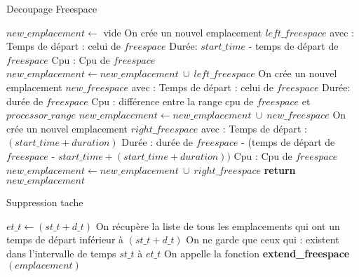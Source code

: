 \documentclass{report}
\begin{document}
\begin{algorithm}
\caption{Decoupage Freespace}\label{cut_freespace}
\begin{algorithmic}[1]
	\State $new\_emplacement \gets$ vide
	\State
		\State On crée un nouvel emplacement $left\_freespace$ avec :
			\State \hspace{\algorithmicindent} Temps de départ : celui de $freespace$
			\State \hspace{\algorithmicindent} Durée: $start\_time$ - temps de départ de $freespace$
			\State \hspace{\algorithmicindent} Cpu : Cpu de $freespace$
		\State $new\_emplacement \gets new\_emplacement\ \cup\ left\_freespace$ 
	\EndIf
	\State
		\State On crée un nouvel emplacement $new\_freespace$ avec :
			\State \hspace{\algorithmicindent} Temps de départ : celui de $freespace$
			\State \hspace{\algorithmicindent} Durée: durée de $freespace$
			\State \hspace{\algorithmicindent} Cpu : différence entre la range cpu de $freespace$ et $processor\_range$
		\State $new\_emplacement \gets new\_emplacement\ \cup\ new\_freespace$ 
	\EndIf
	\State
	\State On crée un nouvel emplacement $right\_freespace$ avec :
		\State \hspace{\algorithmicindent} Temps de départ : $(start\_time + duration)$
		\State \hspace{\algorithmicindent} Durée : durée de $freespace$ - (temps de départ de $freespace$ - $start\_time + (start\_time + duration))$
		\State \hspace{\algorithmicindent} Cpu : Cpu de $freespace$
	\State $new\_emplacement \gets new\_emplacement\ \cup\ right\_freespace$ 
	\State
	\State \textbf{return} $new\_emplacement$
\EndFunction
\end{algorithmic}
\end{algorithm}

\begin{algorithm}
\caption{Suppression tache}\label{Remove}
\begin{algorithmic}[1]
	\State $et\_t \gets (st\_t + d\_t)$
	\State
	\State On récupère la liste de tous les emplacements qui ont un temps de départ inférieur à $(st\_t + d\_t)$ 
	\State
	\State On ne garde que ceux qui :
		\State \hspace{\algorithmicindent} existent dans l'intervalle de temps $st\_t$ à $et\_t$
	\State
		\State On appelle la fonction \textbf{extend\_freespace}$(emplacement)$
	\EndFor
\EndFunction
\end{algorithmic}
\end{algorithm}
\end{document}
